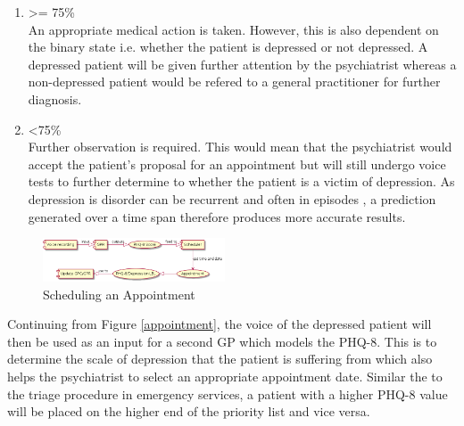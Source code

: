 \documentclass{article}
\begin{document}
	\begin{enumerate}
		\item {\textgreater= 75\%} \\
		An appropriate medical action is taken. 
		However, this is also dependent on the binary state i.e. whether the patient is depressed or not depressed. 
		A depressed patient will be given further attention by the psychiatrist whereas a non-depressed patient would be refered to a general practitioner for further diagnosis.
		\item {\textless 75\%} \\
		Further observation is required. This would mean that the psychiatrist would accept the patient's proposal for an appointment but will still undergo voice tests to further determine to whether the patient is a victim of depression. 
		As depression is disorder can be recurrent and often in episodes \cite{bp6152013}, a prediction generated over a time span therefore produces more accurate results.\\
	\end{enumerate}
	
	\begin{figure}[h]
 		\begin{center}
		\includegraphics[width=0.48\textwidth]{appointment} 
  		\end{center}
  		\caption{Scheduling an Appointment}
  		\label{auto_flow} 
 	\end{figure}

	Continuing from Figure \ref{appointment}, the voice of the depressed patient will then be used as an input for a second GP which models the PHQ-8. 
	This is to determine the scale of depression that the patient is suffering from which also helps the psychiatrist to select an appropriate appointment date. 		
	Similar the to the triage procedure in emergency services, a patient with a higher PHQ-8 value will be placed on the higher end of the priority list and vice versa.
\end{document}
